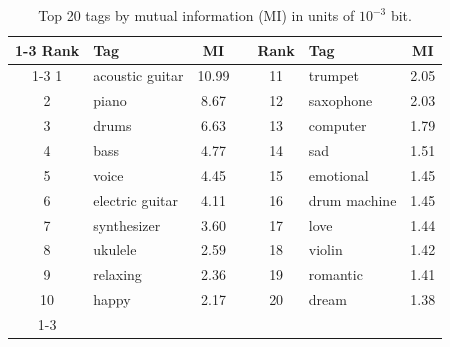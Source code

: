 \begin{table}[t]
    \centering\small
    \caption{Top 20 tags by mutual information (MI) in units of
        $10^{-3}$ bit.}
    \label{tab:tag_mi}
    \begin{tabular}{@{}clc c clc@{}}
        \cmidrule[\heavyrulewidth]{1-3}
        \cmidrule[\heavyrulewidth]{5-7}
        \textbf{Rank} & \textbf{Tag}    & \textbf{MI} &  &
        \textbf{Rank} & \textbf{Tag}    & \textbf{MI}                               \\
        \cmidrule{1-3} \cmidrule{5-7}
        1             & acoustic guitar & 10.99       &  & 11 & trumpet      & 2.05 \\
        2             & piano           & 8.67        &  & 12 & saxophone    & 2.03 \\
        3             & drums           & 6.63        &  & 13 & computer     & 1.79 \\
        4             & bass            & 4.77        &  & 14 & sad          & 1.51 \\
        5             & voice           & 4.45        &  & 15 & emotional    & 1.45 \\
        6             & electric guitar & 4.11        &  & 16 & drum machine & 1.45 \\
        7             & synthesizer     & 3.60        &  & 17 & love         & 1.44 \\
        8             & ukulele         & 2.59        &  & 18 & violin       & 1.42 \\
        9             & relaxing        & 2.36        &  & 19 & romantic     & 1.41 \\
        10            & happy           & 2.17        &  & 20 & dream        & 1.38 \\
        \cmidrule[\heavyrulewidth]{1-3}
        \cmidrule[\heavyrulewidth]{5-7}
    \end{tabular}
\end{table}


